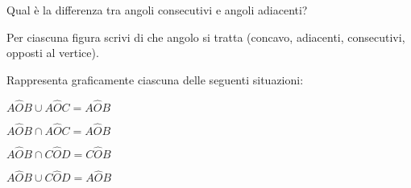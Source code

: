 \begin{esercizio}
\label{ese:1.56}
Qual è la differenza tra angoli consecutivi e angoli adiacenti?
\end{esercizio}

\begin{esercizio}
\label{ese:1.57}
Per ciascuna figura scrivi di che angolo si tratta 
(concavo, adiacenti, consecutivi, opposti al vertice).
\end{esercizio}

\begin{inaccessibleblock}
 \centering
\end{inaccessibleblock}

\newpage %

\begin{esercizio}
\label{ese:1.58}
Rappresenta graficamente ciascuna delle seguenti situazioni:
\begin{multicols}{2}
\begin{enumeratea}
\item \(A\widehat{O}B\cup A\widehat{O}C=A\widehat{O}B\)
\item \(A\widehat{O}B\cap A\widehat{O}C=A\widehat{O}B\)
\item \(A\widehat{O}B\cap C\widehat{O}D=C\widehat{O}B\)
\item \(A\widehat{O}B\cup C\widehat{O}D=A\widehat{O}B\)
\end{enumeratea}
\end{multicols}
\end{esercizio}

